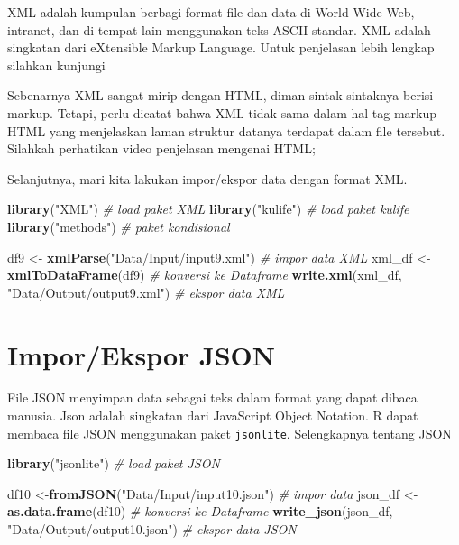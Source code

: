 \documentclass[
]{book}
\newenvironment{Shaded}{\begin{snugshade}}{\end{snugshade}}
\newcommand{\CommentTok}[1]{\textcolor[rgb]{0.56,0.35,0.01}{\textit{#1}}}
\newcommand{\FunctionTok}[1]{\textcolor[rgb]{0.13,0.29,0.53}{\textbf{#1}}}
\newcommand{\NormalTok}[1]{#1}
\newcommand{\OtherTok}[1]{\textcolor[rgb]{0.56,0.35,0.01}{#1}}
\newcommand{\StringTok}[1]{\textcolor[rgb]{0.31,0.60,0.02}{#1}}
\begin{document}
XML adalah kumpulan berbagi format file dan data di World Wide Web, intranet, dan di tempat lain menggunakan teks ASCII standar. XML adalah singkatan dari eXtensible Markup Language. Untuk penjelasan lebih lengkap silahkan kunjungi

Sebenarnya XML sangat mirip dengan HTML, diman sintak-sintaknya berisi markup. Tetapi, perlu dicatat bahwa XML tidak sama dalam hal tag markup HTML yang menjelaskan laman struktur datanya terdapat dalam file tersebut. Silahkah perhatikan video penjelasan mengenai HTML;

Selanjutnya, mari kita lakukan impor/ekspor data dengan format XML.

\begin{Shaded}
\begin{Highlighting}[]
\FunctionTok{library}\NormalTok{(}\StringTok{"XML"}\NormalTok{)                                   }\CommentTok{\# load paket XML }
\FunctionTok{library}\NormalTok{(}\StringTok{"kulife"}\NormalTok{)                                }\CommentTok{\# load paket kulife}
\FunctionTok{library}\NormalTok{(}\StringTok{"methods"}\NormalTok{)                               }\CommentTok{\# paket kondisional}

\NormalTok{df9 }\OtherTok{\textless{}{-}} \FunctionTok{xmlParse}\NormalTok{(}\StringTok{"Data/Input/input9.xml"}\NormalTok{)         }\CommentTok{\# impor data XML}
\NormalTok{xml\_df }\OtherTok{\textless{}{-}} \FunctionTok{xmlToDataFrame}\NormalTok{(df9)                    }\CommentTok{\# konversi ke Dataframe}
\FunctionTok{write.xml}\NormalTok{(xml\_df, }\StringTok{"Data/Output/output9.xml"}\NormalTok{)     }\CommentTok{\# ekspor data XML}
\end{Highlighting}
\end{Shaded}

\hypertarget{imporekspor-json}{%
\section{Impor/Ekspor JSON}\label{imporekspor-json}}

File JSON menyimpan data sebagai teks dalam format yang dapat dibaca manusia. Json adalah singkatan dari JavaScript Object Notation. R dapat membaca file JSON menggunakan paket \texttt{jsonlite}. Selengkapnya tentang JSON

\begin{Shaded}
\begin{Highlighting}[]
\FunctionTok{library}\NormalTok{(}\StringTok{"jsonlite"}\NormalTok{)                              }\CommentTok{\# load paket JSON}

\NormalTok{df10 }\OtherTok{\textless{}{-}}\FunctionTok{fromJSON}\NormalTok{(}\StringTok{"Data/Input/input10.json"}\NormalTok{)       }\CommentTok{\# impor data}
\NormalTok{json\_df }\OtherTok{\textless{}{-}} \FunctionTok{as.data.frame}\NormalTok{(df10)                   }\CommentTok{\# konversi ke Dataframe}
\FunctionTok{write\_json}\NormalTok{(json\_df, }\StringTok{"Data/Output/output10.json"}\NormalTok{) }\CommentTok{\# ekspor data JSON}
\end{Highlighting}
\end{Shaded}
\end{document}
